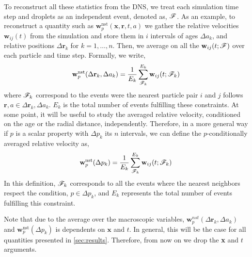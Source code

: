 To reconstruct all these statistics from the DNS, we treat each simulation time step and droplets as an independent event, denoted as, $\mathscr{F}$. 
As an example, to reconstruct a quantity such as $\textbf{w}^\text{nst}_p(\textbf{x},\textbf{r},t,a)$ we gather the relative velocities $\textbf{w}_{ij}(t)$ from the simulation and store them in $i$ intervals of ages $\Delta a_k$, and relative positions $\Delta \textbf{r}_k$ for $k = 1,\ldots, n$.
Then, we average on all the $\textbf{w}_{ij}(t;\mathscr{F})$ over each particle and time step.
Formally, we write, 
\begin{equation}
    \textbf{w}^\text{nst}_p(\Delta\textbf{r}_k,\Delta a_k)
    = \frac{1}{E_k} 
    \sum^{E_k}_{\FF_k} 
    \textbf{w}_{ij}(t;\FF_k)
    \label{eq:vec_cond}
\end{equation}
where $\mathscr{F}_k$ correspond to the events were the nearest particle pair $i$ and $j$ follows $\textbf{r},a \in \Delta \textbf{r}_k ,\Delta a_k$.
$E_k$ is the total number of events fulfilling these constraints. 
At some point, it will be useful to study the averaged relative velocity, conditioned on the age or the radial distance, independently. 
Therefore, in a more general way if $p$ is a scalar property with $\Delta p_k$ its $n$ intervals, we can define the $p$-conditionally averaged relative velocity as, 
\begin{equation}
    \textbf{w}^\text{nst}_p(\Delta p_k)
    = \frac{1}{E_{k}} 
    \sum^{E_{k}}_{\FF_{k}}  
    \textbf{w}_{ij}(t;\FF_k)
    \label{eq:scalar_cond}
\end{equation}
In this definition, $\mathscr{F}_{k}$ corresponds to all the events where the nearest neighbors respect the condition, $p \in \Delta p_k$, and $E_{k}$ represents the total number of events fulfilling this constraint. 

Note that due to the average over the macroscopic variables, $\textbf{w}_p^{nst}(\Delta\textbf{r}_k,\Delta a_k)$ and $\textbf{w}^\text{nst}_p(\Delta p_k)$ is dependents on $\textbf{x}$ and $t$. 
In general, this will be the case for all quantities presented in \ref{sec:results}. 
Therefore, from now on we drop the \textbf{x} and $t$ arguments. 


